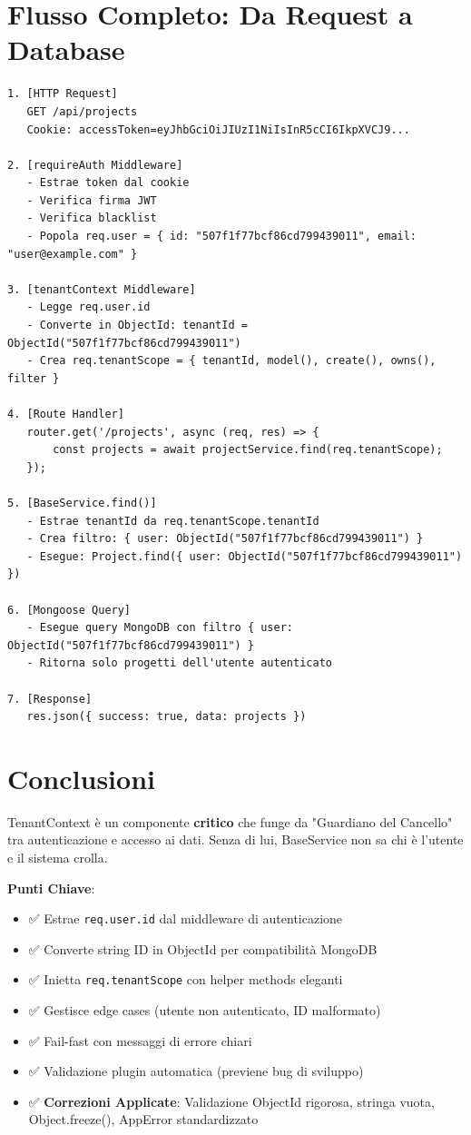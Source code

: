 \documentclass[11pt,a4paper]{article}
\begin{document}
\section{Flusso Completo: Da Request a Database}

\begin{lstlisting}
1. [HTTP Request] 
   GET /api/projects
   Cookie: accessToken=eyJhbGciOiJIUzI1NiIsInR5cCI6IkpXVCJ9...

2. [requireAuth Middleware]
   - Estrae token dal cookie
   - Verifica firma JWT
   - Verifica blacklist
   - Popola req.user = { id: "507f1f77bcf86cd799439011", email: "user@example.com" }

3. [tenantContext Middleware]
   - Legge req.user.id
   - Converte in ObjectId: tenantId = ObjectId("507f1f77bcf86cd799439011")
   - Crea req.tenantScope = { tenantId, model(), create(), owns(), filter }

4. [Route Handler]
   router.get('/projects', async (req, res) => {
       const projects = await projectService.find(req.tenantScope);
   });

5. [BaseService.find()]
   - Estrae tenantId da req.tenantScope.tenantId
   - Crea filtro: { user: ObjectId("507f1f77bcf86cd799439011") }
   - Esegue: Project.find({ user: ObjectId("507f1f77bcf86cd799439011") })

6. [Mongoose Query]
   - Esegue query MongoDB con filtro { user: ObjectId("507f1f77bcf86cd799439011") }
   - Ritorna solo progetti dell'utente autenticato

7. [Response]
   res.json({ success: true, data: projects })
\end{lstlisting}

\section{Conclusioni}

TenantContext è un componente \textbf{critico} che funge da "Guardiano del Cancello" tra autenticazione e accesso ai dati. Senza di lui, BaseService non sa chi è l'utente e il sistema crolla.

\textbf{Punti Chiave}:
\begin{itemize}
    \item ✅ Estrae \texttt{req.user.id} dal middleware di autenticazione
    \item ✅ Converte string ID in ObjectId per compatibilità MongoDB
    \item ✅ Inietta \texttt{req.tenantScope} con helper methods eleganti
    \item ✅ Gestisce edge cases (utente non autenticato, ID malformato)
    \item ✅ Fail-fast con messaggi di errore chiari
    \item ✅ Validazione plugin automatica (previene bug di sviluppo)
    \item ✅ \textbf{Correzioni Applicate}: Validazione ObjectId rigorosa, stringa vuota, Object.freeze(), AppError standardizzato
\end{itemize}
\end{document}
